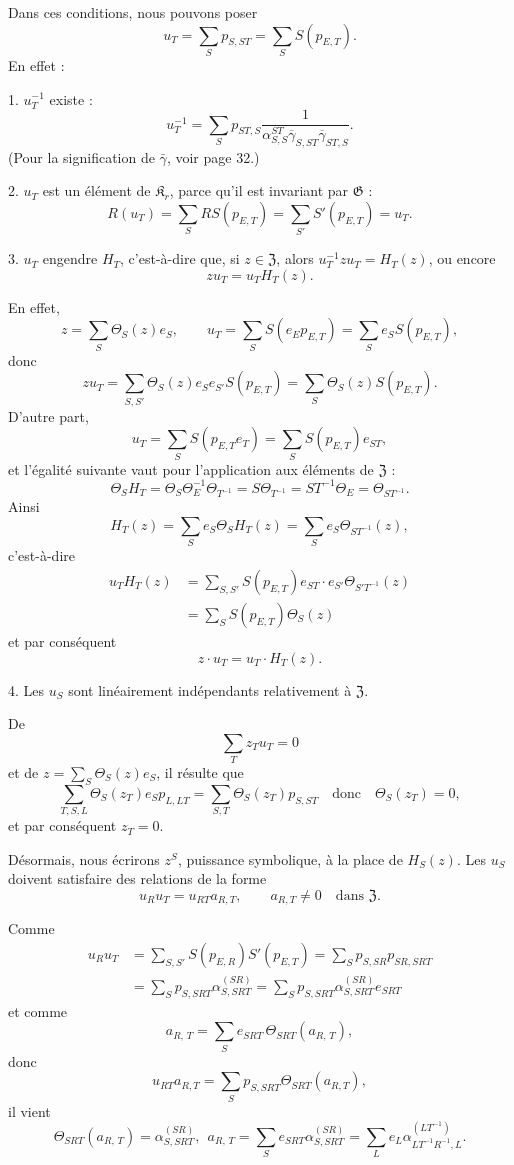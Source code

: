 Dans ces conditions, nous pouvons poser
\[
u_T=\sum_S p_{S,ST}=\sum_S S(p_{E,T}).
\]
En effet :

1. \(u_T^{-1}\) existe :
\[
u_T^{-1}=\sum_S p_{ST,S}
\frac{1}{\alpha_{S,S}^{ST}\overline{\gamma}_{S,ST}\overline{\gamma}_{ST,S}}.
\]
(Pour la signification de \(\bar{\gamma}\), voir page 32.)

2. \(u_T\) est un élément de \(\mathfrak K_r\), parce qu'il est invariant par \(\mathfrak G\) :
\[
R(u_T)=\sum_S RS(p_{E,T})=\sum_{S'} S'(p_{E,T})=u_T.
\]

3. \(u_T\) engendre \(H_T\), c'est-à-dire que, si \(z\in\mathfrak Z\), alors \(u_T^{-1}zu_T=H_T(z)\), ou encore
\[
z u_T=u_T H_T(z).
\]

En effet,
\[
z=\sum_S\Theta_S(z)e_S,\qquad
u_T=\sum_S S(e_Ep_{E,T})=\sum_S e_S S(p_{E,T}),
\]
donc
\[
zu_T=\sum_{S,S'}\Theta_S(z)e_Se_{S'}S(p_{E,T})
=\sum_S\Theta_S(z)S(p_{E,T}).
\]
D'autre part,
\[
u_T=\sum_S S(p_{E,T}e_T)=\sum_S S(p_{E,T})e_{ST},
\]
et l'égalité suivante vaut pour l'application aux éléments de \(\mathfrak Z\) :
\[
\Theta_S H_T=\Theta_S\Theta_E^{-1}\Theta_{T^{-1}}
=S\Theta_{T^{-1}}=ST^{-1}\Theta_E=\Theta_{ST^{-1}}.
\]
Ainsi
\[
H_T(z)=\sum_S e_S\Theta_S H_T(z)=\sum_S e_S\Theta_{ST^{-1}}(z),
\]
c'est-à-dire
\[
\begin{aligned}
u_TH_T(z)
&=\sum_{S,S'} S(p_{E,T})e_{ST}\cdot e_{S'}\Theta_{S'T^{-1}}(z)\\
&=\sum_S S(p_{E,T})\Theta_S(z)
\end{aligned}
\]
et par conséquent
\[
z\cdot u_T=u_T\cdot H_T(z).
\]

4. Les \(u_S\) sont linéairement indépendants relativement à \(\mathfrak Z\).

De
\[
\sum_T z_Tu_T=0
\]
et de \(z=\sum_S\Theta_S(z)e_S\), il résulte que
\[
\sum_{T,S,L}\Theta_S(z_T)e_Sp_{L,LT}
=\sum_{S,T}\Theta_S(z_T)p_{S,ST}\quad\text{donc}\quad
\Theta_S(z_T)=0,
\]
et par conséquent \(z_T=0\).

Désormais, nous écrirons \(z^S\), \og puissance symbolique\fg{}, à la place de \(H_S(z)\). Les \(u_S\) doivent satisfaire des relations de la forme
\[
u_Ru_T=u_{RT}a_{R,T},\qquad a_{R,T}\ne0\quad\text{dans }\mathfrak Z.
\]

Comme
\[
\begin{aligned}
u_Ru_T
&=\sum_{S,S'} S(p_{E,R})S'(p_{E,T})
=\sum_S p_{S,SR}p_{SR,SRT}\\
&=\sum_S p_{S,SRT}\alpha_{S,SRT}^{(SR)}
=\sum_S p_{S,SRT}\alpha_{S,SRT}^{(SR)}e_{SRT}
\end{aligned}
\]
et comme
\[
a_{R,\,T} = \sum\limits_{S} e_{SRT}\, \Theta_{SRT} \left(a_{R,\,T}\right),
\]
donc
\[
u_{RT} a_{R,T} = \sum\limits_{S} p_{S,SRT} \Theta_{SRT} (a_{R,T}),
\]
il vient
\[
\Theta_{SRT}(a_{R,\,T}) = \alpha_{S,SRT}^{(SR)}, ~~ a_{R,\,T} = \sum\limits_{S} e_{SRT} \alpha_{S,SRT}^{(SR)} = \sum\limits_{L} e_{L} \alpha_{LT^{-1}R^{-1},L}^{(LT^{-1})}.
\]

